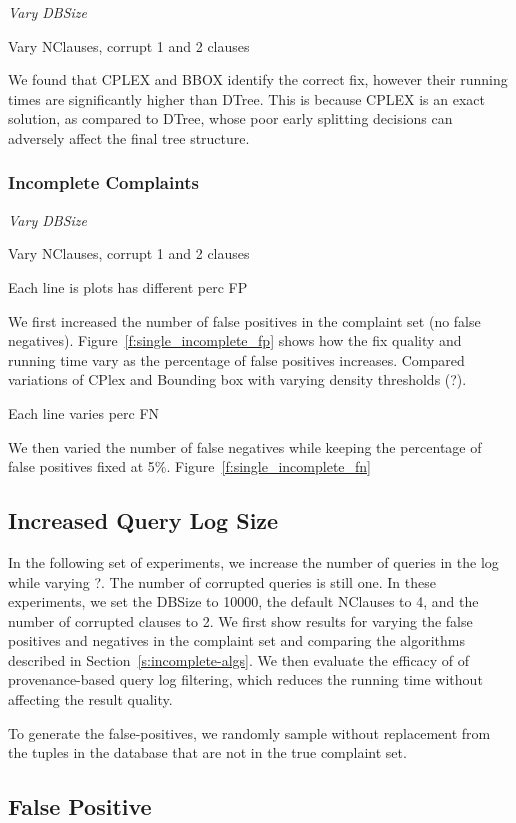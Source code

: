 {\it Vary DBSize

Vary NClauses, corrupt 1 and 2 clauses
}

We found that CPLEX and BBOX identify the correct fix, however their
running times are significantly higher than DTree.  This is because
CPLEX is an exact solution, as compared to DTree, whose poor early
splitting decisions can adversely affect the final tree structure.

\subsubsection{Incomplete Complaints}


{\it 
Vary DBSize

Vary NClauses, corrupt 1 and 2 clauses

Each line is plots has different perc FP
}

We first increased the number of false positives in the complaint set (no false negatives).
Figure~\ref{f:single_incomplete_fp} shows how the fix quality and running time vary as the
percentage of false positives increases.   Compared variations of CPlex and Bounding box with varying
density thresholds (?).

Each line varies perc FN

We then varied the number of false negatives while keeping the percentage of false positives fixed at 5\%.
Figure~\ref{f:single_incomplete_fn} 


\subsection{Increased Query Log Size}

In the following set of experiments, we increase the number of
queries in the log while varying ?.  The number of corrupted queries
is still one.  In these experiments, we set the DBSize to 10000,
the default NClauses to 4, and the number of corrupted clauses to
2.   We first show results for varying the false positives and
negatives in the complaint set and comparing the algorithms described
in Section~\ref{s:incomplete-algs}.  We then evaluate the efficacy
of of provenance-based query log filtering, which reduces the running
time without affecting the result quality.

To generate the false-positives, we randomly sample without replacement
from the tuples in the database that are not in the true complaint
set.

\subsection{False Positive}

